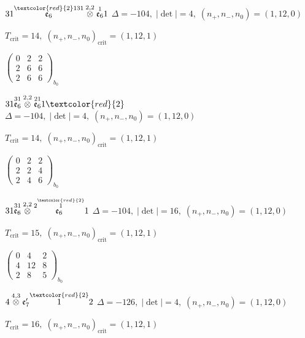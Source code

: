 \documentclass[10pt]{article}
\begin{document}
$31\overset{\textcolor{red}{2}131}{\mathfrak{e}_6}\overset{2,2}{\otimes}\overset{1}{\mathfrak{e}_6}1$ \quad $\Delta=-104,\; |\det|=4,\; (n_+,n_-,n_0)=(1,12,0)$

\hspace{1em}$T_{\text{crit}}=14,\; (n_+,n_-,n_0)_{\text{crit}}=(1,12,1)$

\hspace{2em}$\left(\begin{smallmatrix}0 & 2 & 2 \\ 2 & 6 & 6 \\ 2 & 6 & 6\end{smallmatrix}\right)_{\!b_0}$

\smallskip

$31\overset{31}{\mathfrak{e}_6}\overset{2,2}{\otimes}\overset{21}{\mathfrak{e}_6}1\textcolor{red}{2}$ \quad $\Delta=-104,\; |\det|=4,\; (n_+,n_-,n_0)=(1,12,0)$

\hspace{1em}$T_{\text{crit}}=14,\; (n_+,n_-,n_0)_{\text{crit}}=(1,12,1)$

\hspace{2em}$\left(\begin{smallmatrix}0 & 2 & 2 \\ 2 & 2 & 4 \\ 2 & 4 & 6\end{smallmatrix}\right)_{\!b_0}$

$31\overset{31}{\mathfrak{e}_6}\overset{2,2}{\otimes}\overset{2\overset{\textcolor{red}{2}}{1}}{\mathfrak{e}_6}1$ \quad $\Delta=-104,\; |\det|=16,\; (n_+,n_-,n_0)=(1,12,0)$

\hspace{1em}$T_{\text{crit}}=15,\; (n_+,n_-,n_0)_{\text{crit}}=(1,12,1)$

\hspace{2em}$\left(\begin{smallmatrix}0 & 4 & 2 \\ 4 & 12 & 8 \\ 2 & 8 & 5\end{smallmatrix}\right)_{\!b_0}$

\smallskip

$4\overset{4,3}{\otimes}\mathfrak{e}_7'\overset{\textcolor{red}{2}}{1}2$ \quad $\Delta=-126,\; |\det|=4,\; (n_+,n_-,n_0)=(1,12,0)$

\hspace{1em}$T_{\text{crit}}=16,\; (n_+,n_-,n_0)_{\text{crit}}=(1,12,1)$
\end{document}
